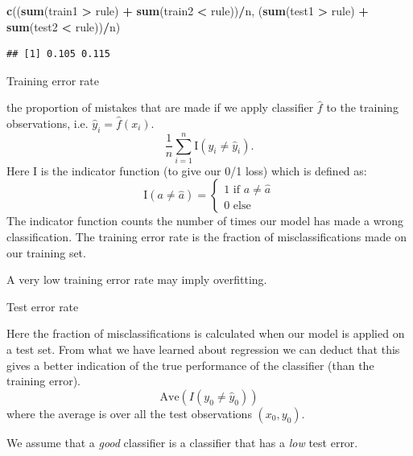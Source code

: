 \documentclass[10pt,ignorenonframetext,]{beamer}
\newenvironment{Shaded}{\begin{snugshade}}{\end{snugshade}}
\newcommand{\KeywordTok}[1]{\textcolor[rgb]{0.13,0.29,0.53}{\textbf{#1}}}
\newcommand{\StringTok}[1]{\textcolor[rgb]{0.31,0.60,0.02}{#1}}
\newcommand{\OperatorTok}[1]{\textcolor[rgb]{0.81,0.36,0.00}{\textbf{#1}}}
\newcommand{\NormalTok}[1]{#1}
\begin{document}
\begin{frame}[fragile]
\begin{Shaded}
\begin{Highlighting}[]
\KeywordTok{c}\NormalTok{((}\KeywordTok{sum}\NormalTok{(train1 }\OperatorTok{>}\StringTok{ }\NormalTok{rule) }\OperatorTok{+}\StringTok{ }\KeywordTok{sum}\NormalTok{(train2 }\OperatorTok{<}\StringTok{ }\NormalTok{rule))}\OperatorTok{/}\NormalTok{n, (}\KeywordTok{sum}\NormalTok{(test1 }\OperatorTok{>}\StringTok{ }\NormalTok{rule) }\OperatorTok{+}\StringTok{ }\KeywordTok{sum}\NormalTok{(test2 }\OperatorTok{<}\StringTok{ }
\StringTok{    }\NormalTok{rule))}\OperatorTok{/}\NormalTok{n)}
\end{Highlighting}
\end{Shaded}

\begin{verbatim}
## [1] 0.105 0.115
\end{verbatim}

\normalsize

\end{frame}

\begin{frame}

\begin{block}{Training error rate}

the proportion of mistakes that are made if we apply classifier
\(\hat{f}\) to the training observations, i.e.
\(\hat{y}_i=\hat{f}(x_i)\).
\[\frac{1}{n}\sum_{i=1}^n \text{I}(y_i \neq \hat{y}_i).\] Here I is the
indicator function (to give our 0/1 loss) which is defined as:
\[\text{I}(a\neq\hat{a}) = \begin{cases} 1 \text{ if } a \neq \hat{a} \\ 0 \text{ else } \end{cases}\]
The indicator function counts the number of times our model has made a
wrong classification. The training error rate is the fraction of
misclassifications made on our training set.

A very low training error rate may imply overfitting.

\end{block}

\end{frame}

\begin{frame}

\begin{block}{Test error rate}

Here the fraction of misclassifications is calculated when our model is
applied on a test set. From what we have learned about regression we can
deduct that this gives a better indication of the true performance of
the classifier (than the training error).
\[\text{Ave}(I(y_0\neq \hat{y}_0))\] where the average is over all the
test observations \((x_0,y_0)\).

We assume that a \emph{good} classifier is a classifier that has a
\emph{low} test error.

\end{block}

\end{frame}
\end{document}

